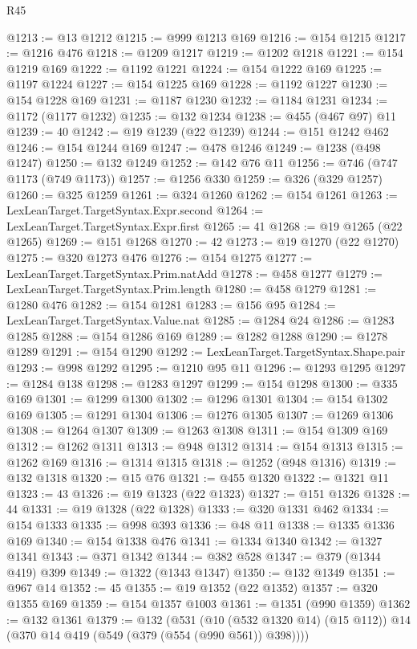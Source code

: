 \begin{lexlean}{R45}
\begin{coremodule}
@1213 := @13 @1212
@1215 := @999 @1213 @169
@1216 := @154 @1215
@1217 := @1216 @476
@1218 := @1209 @1217
@1219 := @1202 @1218
@1221 := @154 @1219 @169
@1222 := @1192 @1221
@1224 := @154 @1222 @169
@1225 := @1197 @1224
@1227 := @154 @1225 @169
@1228 := @1192 @1227
@1230 := @154 @1228 @169
@1231 := @1187 @1230
@1232 := @1184 @1231
@1234 := @1172 (@1177 @1232)
@1235 := @132 @1234
@1238 := @455 (@467 @97) @11
@1239 := 40
@1242 := @19 @1239 (@22 @1239)
@1244 := @151 @1242 @462
@1246 := @154 @1244 @169
@1247 := @478 @1246
@1249 := @1238 (@498 @1247)
@1250 := @132 @1249
@1252 := @142 @76 @11
@1256 := @746 (@747 @1173 (@749 @1173))
@1257 := @1256 @330
@1259 := @326 (@329 @1257)
@1260 := @325 @1259
@1261 := @324 @1260
@1262 := @154 @1261
@1263 := LexLeanTarget.TargetSyntax.Expr.second
@1264 := LexLeanTarget.TargetSyntax.Expr.first
@1265 := 41
@1268 := @19 @1265 (@22 @1265)
@1269 := @151 @1268
@1270 := 42
@1273 := @19 @1270 (@22 @1270)
@1275 := @320 @1273 @476
@1276 := @154 @1275
@1277 := LexLeanTarget.TargetSyntax.Prim.natAdd
@1278 := @458 @1277
@1279 := LexLeanTarget.TargetSyntax.Prim.length
@1280 := @458 @1279
@1281 := @1280 @476
@1282 := @154 @1281
@1283 := @156 @95
@1284 := LexLeanTarget.TargetSyntax.Value.nat
@1285 := @1284 @24
@1286 := @1283 @1285
@1288 := @154 @1286 @169
@1289 := @1282 @1288
@1290 := @1278 @1289
@1291 := @154 @1290
@1292 := LexLeanTarget.TargetSyntax.Shape.pair
@1293 := @998 @1292
@1295 := @1210 @95 @11
@1296 := @1293 @1295
@1297 := @1284 @138
@1298 := @1283 @1297
@1299 := @154 @1298
@1300 := @335 @169
@1301 := @1299 @1300
@1302 := @1296 @1301
@1304 := @154 @1302 @169
@1305 := @1291 @1304
@1306 := @1276 @1305
@1307 := @1269 @1306
@1308 := @1264 @1307
@1309 := @1263 @1308
@1311 := @154 @1309 @169
@1312 := @1262 @1311
@1313 := @948 @1312
@1314 := @154 @1313
@1315 := @1262 @169
@1316 := @1314 @1315
@1318 := @1252 (@948 @1316)
@1319 := @132 @1318
@1320 := @15 @76
@1321 := @455 @1320
@1322 := @1321 @11
@1323 := 43
@1326 := @19 @1323 (@22 @1323)
@1327 := @151 @1326
@1328 := 44
@1331 := @19 @1328 (@22 @1328)
@1333 := @320 @1331 @462
@1334 := @154 @1333
@1335 := @998 @393
@1336 := @48 @11
@1338 := @1335 @1336 @169
@1340 := @154 @1338 @476
@1341 := @1334 @1340
@1342 := @1327 @1341
@1343 := @371 @1342
@1344 := @382 @528
@1347 := @379 (@1344 @419) @399
@1349 := @1322 (@1343 @1347)
@1350 := @132 @1349
@1351 := @967 @14
@1352 := 45
@1355 := @19 @1352 (@22 @1352)
@1357 := @320 @1355 @169
@1359 := @154 @1357 @1003
@1361 := @1351 (@990 @1359)
@1362 := @132 @1361
@1379 := @132
    (@531
      (@10 (@532 @1320 @14) (@15 @112))
      @14
      (@370 @14 @419 (@549 (@379 (@554 (@990 @561)) @398))))

\end{coremodule}
\end{lexlean}
